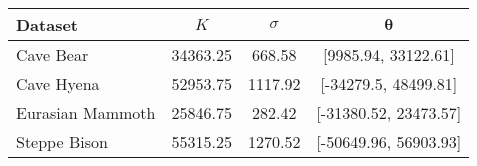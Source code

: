 
\begin{tabular}{lccc}
\toprule
Dataset & $K$ & $\sigma$ & $\bm{\theta}$\\
\midrule
Cave Bear & 34363.25 & 668.58 & {}[9985.94, 33122.61]\\
Cave Hyena & 52953.75 & 1117.92 & {}[-34279.5, 48499.81]\\
Eurasian Mammoth & 25846.75 & 282.42 & {}[-31380.52, 23473.57]\\
Steppe Bison & 55315.25 & 1270.52 & {}[-50649.96, 56903.93]\\
\bottomrule
\end{tabular}
